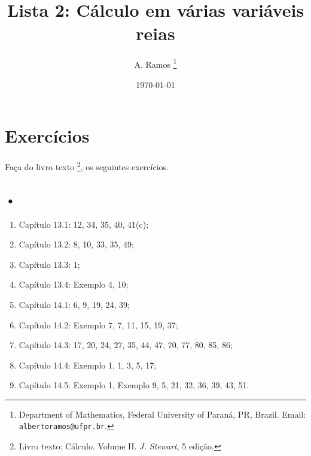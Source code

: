 \documentclass[11pt]{article}
\begin{document}
\title{Lista 2: Cálculo em várias variáveis reias }
 
\author{
A. Ramos \thanks{Department of Mathematics,
    Federal University of Paraná, PR, Brazil.
    Email: {\tt albertoramos@ufpr.br}.}
}

\date{\today}
 
\maketitle

  \section{Exercícios}   
 
 Faça do livro texto \footnote{Livro texto: Cálculo. Volume II. {\it J. Stewart}, 5 edição.}, os seguintes exercícios. 
  
    \subsection*{•}
     
     \begin{enumerate}
     \item Capítulo 13.1: 12, 34, 35, 40, 41(c);
     \item Capítulo 13.2: 8, 10, 33, 35, 49; 
     \item Capítulo 13.3: 1;
     \item Capítulo 13.4: Exemplo 4, 10; 
     \item Capítulo 14.1: 6, 9, 19, 24, 39; 
     \item Capítulo 14.2: Exemplo 7, 7, 11, 15, 19, 37;      
     \item Capítulo 14.3: 17, 20, 24, 27, 35, 44, 47, 70, 77, 80, 85, 86;
     \item Capítulo 14.4: Exemplo 1, 1, 3, 5, 17;      
     \item Capítulo 14.5: Exemplo 1, Exemplo 9, 5, 21, 32, 36, 39, 43, 51.           
     \end{enumerate}
 
\end{document}
